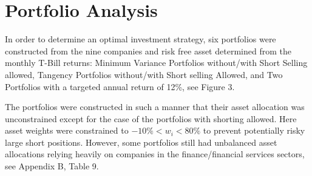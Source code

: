 \documentclass[10pt]{article_simple}
\begin{document}
\section*{Portfolio Analysis}
In order to determine an optimal investment strategy, six portfolios were constructed from the nine companies and risk free asset determined from the monthly T-Bill returns: Minimum Variance Portfolios without/with Short Selling allowed, Tangency Portfolios without/with Short selling Allowed, and Two Portfolios with a targeted annual return of 12\%, see Figure 3.

The portfolios were constructed in such a manner that their asset allocation was unconstrained except for the case of the portfolios with shorting allowed. Here asset weights were constrained to $-10\% < w_i < 80\%$ to prevent potentially risky large short positions. However, some portfolios still had unbalanced asset allocations relying heavily on companies in the finance/financial services sectors, see Appendix B, Table 9.
\end{document}
